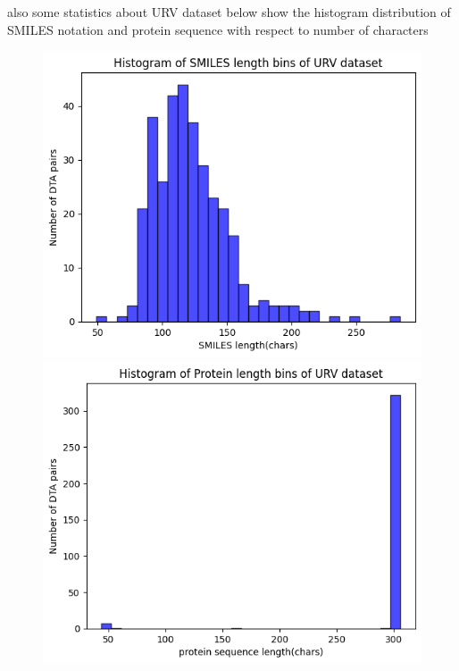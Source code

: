 \documentclass[11pt, a4paper]{article}
\begin{document}
        also some statistics about URV dataset below show the histogram distribution of SMILES notation and protein sequence with respect to number of characters

        \begin{figure}[H]
            \centering
            \begin{minipage}{0.45\textwidth}
            \includegraphics[width=\textwidth]{URV/smiles histogram.png}
            \end{minipage}
            \hfill
            \begin{minipage}{0.45\textwidth}
            \includegraphics[width=\textwidth]{URV/protein histogram.png}
            \end{minipage}
        \end{figure}
\end{document}
